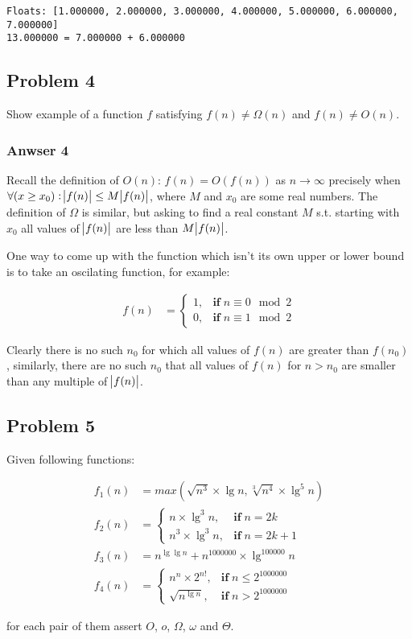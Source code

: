 \documentclass[11pt]{article}
\begin{document}
\begin{verbatim}
Floats: [1.000000, 2.000000, 3.000000, 4.000000, 5.000000, 6.000000, 7.000000]
13.000000 = 7.000000 + 6.000000
\end{verbatim}


\subsection{Problem 4}
\label{sec:orgheadline9}
Show example of a function \(f\) satisfying \(f(n) \neq \Omega(n)\) and
\(f(n) \neq O(n)\).

\subsubsection{Anwser 4}
\label{sec:orgheadline8}
Recall the definition of \(O(n)\): \(f(n) = O(f(n))\) as \(n \to \infty\)
precisely when \(\forall (x \geq x_0): \abs{f(n)} \leq M \abs{f(n)}\), where
\(M\) and \(x_0\) are some real numbers.  The definition of \(\Omega\) is similar,
but asking to find a real constant \(M\) s.t. starting with \(x_0\) all values
of \(\abs{f(n)}\) are less than \(M\abs{f(n)}\).

One way to come up with the function which isn't its own upper or lower bound
is to take an oscilating function, for example:

\begin{align*}
  f(n) &= \begin{cases}
    1, &\textbf{if}\; n \equiv 0 \mod 2 \\
    0, &\textbf{if}\; n \equiv 1 \mod 2
  \end{cases}
\end{align*}

Clearly there is no such \(n_0\) for which all values of \(f(n)\) are greater
than \(f(n_0)\), similarly, there are no such \(n_0\) that all values of \(f(n)\)
for \(n > n_0\) are smaller than any multiple of \(\abs{f(n)}\).

\subsection{Problem 5}
\label{sec:orgheadline10}
Given following functions:

\begin{align*}
  f_1(n) &= max\left(\sqrt{n^3} \times \lg n, \sqrt[3]{n^4} \times \lg^5 n\right) \\
  f_2(n) &= \begin{cases}
    n \times \lg^3 n, &\textbf{if}\; n = 2k \\
    n^3 \times \lg^3 n, &\textbf{if}\; n = 2k + 1
  \end{cases} \\
  f_3(n) &= n^{\lg\lg n} + n^{1000000} \times \lg^{100000} n \\
  f_4(n) &= \begin{cases}
    n^n \times 2^{n!}, &\textbf{if}\; n \leq 2^{1000000} \\
    \sqrt{n^{\lg n}}, &\textbf{if}\; n > 2^{1000000}
  \end{cases}
\end{align*}

for each pair of them assert \(O\), \(o\), \(\Omega\), \(\omega\) and \(\Theta\).
\end{document}
